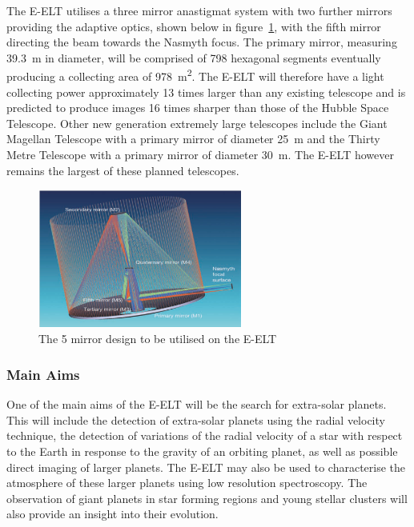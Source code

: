 	The E-ELT utilises a three mirror anastigmat system with two further mirrors providing the adaptive optics, shown below in figure~\ref{fig:5_mirror_eelt}, with the fifth mirror directing the beam towards the Nasmyth focus\cite[p.~16]{E_ELT_Construction_Proposal}. The primary mirror, measuring \SI{39.3}{\metre} in diameter, will be comprised of 798 hexagonal segments eventually producing a collecting area of \SI{978}{\square\metre}. The E-ELT will therefore have a light collecting power approximately 13 times larger than any existing telescope and is predicted to produce images 16 times sharper than those of the Hubble Space Telescope. Other new generation extremely large telescopes include the Giant Magellan Telescope with a primary mirror of diameter \SI{25}{\metre} and the Thirty Metre Telescope with a primary mirror of diameter \SI{30}{\metre}. The E-ELT however remains the largest of these planned telescopes.
	\begin{figure}[ht]
		\centering
		\includegraphics[width=0.6\textwidth]{../Images/Anastigmat.png}
		\caption{The 5 mirror design to be utilised on the E-ELT}\label{fig:5_mirror_eelt}
	\end{figure}

	\subsubsection{Main Aims} %
	\label{ssub:main_aims}
		One of the main aims of the E-ELT will be the search for extra-solar planets.  This will include the detection of extra-solar planets using the radial velocity technique, the detection of variations of the radial velocity of a star with respect to the Earth in response to the gravity of an orbiting planet, as well as possible direct imaging of larger planets. The E-ELT may also be used to characterise the atmosphere of these larger planets using low resolution spectroscopy. The observation of giant planets in star forming regions and young stellar clusters will also provide an insight into their evolution.

